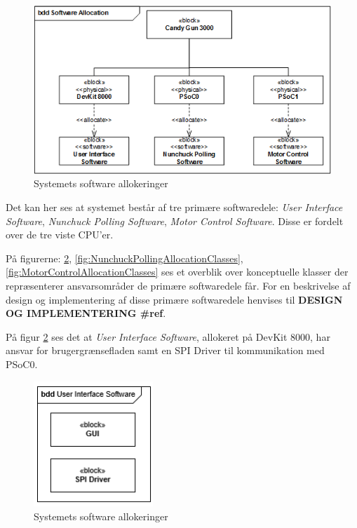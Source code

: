 \begin{figure}[H]
	\centering
	\includegraphics[width=\textwidth]{SystemArkitektur/images/SoftwareAllocation.PNG}
	\caption{Systemets software allokeringer}
	\label{figure:allocationDiagram}
\end{figure}

Det kan her ses at systemet består af tre primære softwaredele: \textit{User Interface Software}, \textit{Nunchuck Polling Software}, \textit{Motor Control Software}. Disse er fordelt over de tre viste CPU'er.

På figurerne: \ref{fig:UserInterfaceAllocationClasses}, \ref{fig:NunchuckPollingAllocationClasses}, \ref{fig:MotorControlAllocationClasses} ses et overblik over konceptuelle klasser der repræsenterer ansvarsområder de primære softwaredele får. For en beskrivelse af design og implementering af disse primære softwaredele henvises til \textbf{DESIGN OG IMPLEMENTERING \#ref}.

På figur \ref{fig:UserInterfaceAllocationClasses} ses det at \textit{User Interface Software}, allokeret på DevKit 8000, har ansvar for brugergrænsefladen samt en SPI Driver til kommunikation med PSoC0. 

\begin{figure}[H]
	\centering
	\includegraphics[width=0.4\textwidth]{SystemArkitektur/images/UserInterfaceAllocationClasses.PNG}
	\caption{Systemets software allokeringer}
	\label{fig:UserInterfaceAllocationClasses}
\end{figure}

